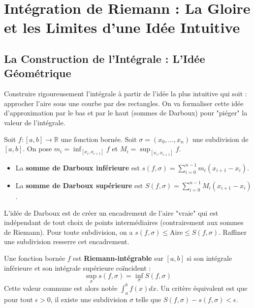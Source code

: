 \chapter{Intégration de Riemann : La Gloire et les Limites d'une Idée Intuitive}


\section{La Construction de l'Intégrale : L'Idée Géométrique}

\begin{objectif}
    Construire rigoureusement l'intégrale à partir de l'idée la plus intuitive qui soit : approcher l'aire sous une courbe par des rectangles. On va formaliser cette idée d'approximation par le bas et par le haut (sommes de Darboux) pour "piéger" la valeur de l'intégrale.
\end{objectif}

\begin{definition}
    Soit $f: [a,b] \to \mathbb{R}$ une fonction bornée. Soit $\sigma = (x_0, \dots, x_n)$ une subdivision de $[a,b]$. On pose $m_i = \inf_{[x_i, x_{i+1}]} f$ et $M_i = \sup_{[x_i, x_{i+1}]} f$.
    \begin{itemize}
        \item La \textbf{somme de Darboux inférieure} est $s(f, \sigma) = \sum_{i=0}^{n-1} m_i (x_{i+1}-x_i)$.
        \item La \textbf{somme de Darboux supérieure} est $S(f, \sigma) = \sum_{i=0}^{n-1} M_i (x_{i+1}-x_i)$.
    \end{itemize}
\end{definition}

\begin{remark}[L'Encadrement]
    L'idée de Darboux est de créer un encadrement de l'aire "vraie" qui est indépendant de tout choix de points intermédiaires (contrairement aux sommes de Riemann). Pour toute subdivision, on a $s(f, \sigma) \le \text{Aire} \le S(f, \sigma)$. Raffiner une subdivision resserre cet encadrement.
\end{remark}

\begin{definition}
    Une fonction bornée $f$ est \textbf{Riemann-intégrable} sur $[a,b]$ si son intégrale inférieure et son intégrale supérieure coïncident :
    $$ \sup_{\sigma} s(f, \sigma) = \inf_{\sigma} S(f, \sigma) $$
    Cette valeur commune est alors notée $\int_a^b f(x) dx$.
    Un critère équivalent est que pour tout $\epsilon > 0$, il existe une subdivision $\sigma$ telle que $S(f,\sigma) - s(f,\sigma) < \epsilon$.
\end{definition}

